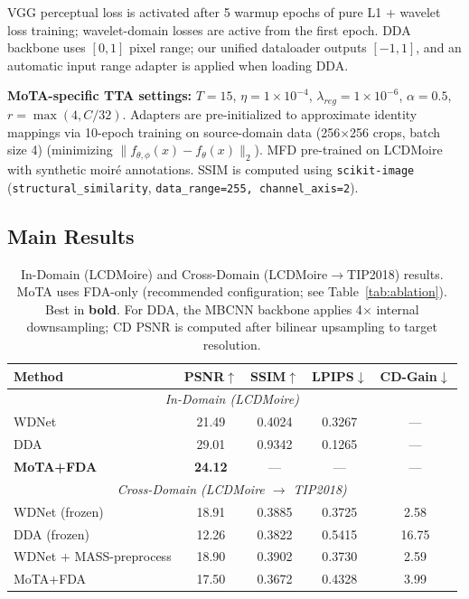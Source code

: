 \documentclass[10pt,twocolumn,letterpaper]{article}
\begin{document}
VGG perceptual loss is activated after 5 warmup epochs of pure L1 + wavelet loss training; wavelet-domain losses are active from the first epoch. DDA backbone uses $[0,1]$ pixel range; our unified dataloader outputs $[-1,1]$, and an automatic input range adapter is applied when loading DDA.

\textbf{MoTA-specific TTA settings:} $T = 15$, $\eta = 1 \times 10^{-4}$, $\lambda_{reg} = 1\times 10^{-6}$, $\alpha = 0.5$, $r = \max(4, C/32)$. Adapters are pre-initialized to approximate identity mappings via 10-epoch training on source-domain data (256$\times$256 crops, batch size 4) (minimizing $\|f_{\theta,\phi}(x) - f_\theta(x)\|_2$). MFD pre-trained on LCDMoire with synthetic moir\'{e} annotations. SSIM is computed using \texttt{scikit-image} (\texttt{structural\_similarity}, \texttt{data\_range=255, channel\_axis=2}).


\FloatBarrier
\subsection{Main Results}

\begin{table}[tbp]
\centering
\footnotesize
\caption{In-Domain (LCDMoire) and Cross-Domain (LCDMoire$\to$TIP2018) results. MoTA uses FDA-only (recommended configuration; see Table~\ref{tab:ablation}). Best in \textbf{bold}. For DDA, the MBCNN backbone applies 4$\times$ internal downsampling; CD PSNR is computed after bilinear upsampling to target resolution.}
\label{tab:main_results}
\setlength{\tabcolsep}{2.5pt}
\begin{tabular}{@{}lcccc@{}}
\toprule
Method & PSNR$\uparrow$ & SSIM$\uparrow$ & LPIPS$\downarrow$ & CD-Gain$\downarrow$ \\
\midrule
\multicolumn{5}{c}{\textit{In-Domain (LCDMoire)}} \\
\midrule
WDNet \cite{liu2020wavelet} & 21.49 & 0.4024 & 0.3267 & --- \\
DDA \cite{anonymous2023dda} & 29.01 & 0.9342 & 0.1265 & --- \\
\textbf{MoTA+FDA} & \textbf{24.12} & --- & --- & --- \\
\midrule
\multicolumn{5}{c}{\textit{Cross-Domain (LCDMoire $\to$ TIP2018)}} \\
\midrule
WDNet (frozen) & 18.91 & 0.3885 & 0.3725 & 2.58 \\
DDA (frozen) & 12.26 & 0.3822 & 0.5415 & 16.75 \\
WDNet + MASS-preprocess & 18.90 & 0.3902 & 0.3730 & 2.59 \\
MoTA+FDA & 17.50 & 0.3672 & 0.4328 & 3.99 \\
\bottomrule
\end{tabular}
\end{table}
\end{document}
